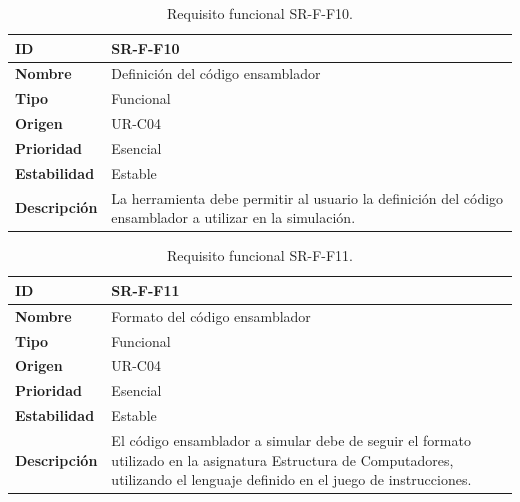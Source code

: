 \begin{center}
\begin{table}[htbp]
\centering
\caption{Requisito funcional SR-F-F10.}
\begin{tabular}{@{}p{2.5cm} p{9cm}@{}} 
\toprule
\textbf{ID} 				& SR-F-F10 \\
\midrule
\textbf{Nombre} 			& Definición del código ensamblador\\
\midrule
\textbf{Tipo} 			& Funcional \\
\midrule
\textbf{Origen} 			& UR-C04 \\
\midrule
\textbf{Prioridad}		& Esencial \\
\midrule
\textbf{Estabilidad} 		& Estable \\
\midrule
\textbf{Descripción} 	& La herramienta debe permitir al usuario la definición del código ensamblador a utilizar en la simulación. \\
\bottomrule
\end{tabular}
\label{tab:srff10}
\end{table}
\end{center}

\begin{center}
\begin{table}[htbp]
\centering
\caption{Requisito funcional SR-F-F11.}
\begin{tabular}{@{}p{2.5cm} p{9cm}@{}} 
\toprule
\textbf{ID} 				& SR-F-F11 \\
\midrule
\textbf{Nombre} 			& Formato del código ensamblador\\
\midrule
\textbf{Tipo} 			& Funcional \\
\midrule
\textbf{Origen} 			& UR-C04 \\
\midrule
\textbf{Prioridad}		& Esencial \\
\midrule
\textbf{Estabilidad} 		& Estable \\
\midrule
\textbf{Descripción} 	& El código ensamblador a simular debe de seguir el formato utilizado en la asignatura Estructura de Computadores, utilizando el lenguaje definido en el juego de instrucciones.\\
\bottomrule
\end{tabular}
\label{tab:srff11}
\end{table}
\end{center}

